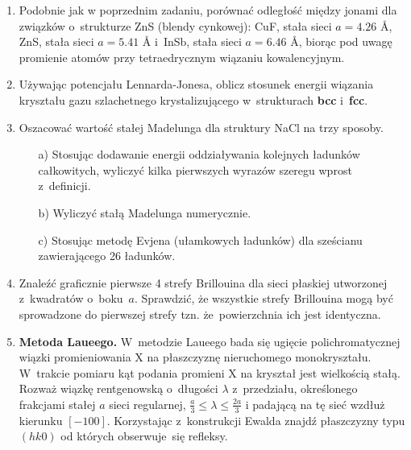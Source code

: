 \documentclass[a4paper,11pt]{article}
\begin{document}
\begin{enumerate}
\item Podobnie jak w poprzednim zadaniu, porównać odległość między
  jonami dla związków o~strukturze ZnS (blendy cynkowej): CuF, stała
  sieci $a = 4.26$ \AA, ZnS, stała sieci $a = 5.41$ \AA{} i~InSb,
  stała sieci $a = 6.46$ \AA, biorąc pod uwagę promienie atomów przy
  tetraedrycznym wiązaniu kowalencyjnym.



\item Używając potencjału Lennarda-Jonesa, oblicz stosunek energii
  wiązania kryształu gazu szlachetnego krystalizującego w~strukturach
  \textbf{bcc} i~\textbf{fcc}.



\item Oszacować wartość stałej Madelunga dla struktury NaCl na trzy
  sposoby.

  \begin{itemize}
  \item[a)] Stosując dodawanie energii oddziaływania kolejnych
    ładunków całkowitych, wyliczyć kilka pierwszych wyrazów szeregu
    wprost z~definicji.

  \item[b)] Wyliczyć stałą Madelunga numerycznie.

  \item[c)] Stosując metodę Evjena (ułamkowych ładunków) dla sześcianu
    zawierającego 26 ładunków.

  \end{itemize}



\item Znaleźć graficznie pierwsze 4 strefy Brillouina dla sieci
  płaskiej utworzonej z~kwadratów o~boku~$a$. Sprawdzić, że wszystkie
  strefy Brillouina mogą być sprowadzone do pierwszej strefy tzn.
  że~powierzchnia ich jest identyczna.



\item \textbf{Metoda Laueego.} W~metodzie Laueego bada się ugięcie
  polichromatycznej wiązki promieniowania X na płaszczyznę
  nieruchomego monokryształu. W~trakcie pomiaru kąt podania promieni X
  na kryształ jest wielkością stałą. Rozważ wiązkę rentgenowską
  o~długości $\lambda$ z~przedziału, określonego frakcjami stałej $a$ sieci
  regularnej, $\frac{ a }{ 3 } \leq \lambda \leq \frac{ 2a }{ 3 }$ i padającą na
  tę sieć wzdłuż kierunku $[-100]$. Korzystając z~konstrukcji Ewalda
  znajdź płaszczyzny typu $(hk0)$ od których obserwuje~się refleksy.




\end{enumerate}
\end{document}

